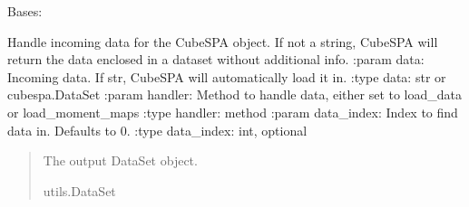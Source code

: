 \documentclass[letterpaper,10pt,english]{sphinxmanual}
\begin{document}

\begin{fulllineitems}
\label{\detokenize{modules:cubespa.data.RGBImage}}
\pysigstartsignatures
{}
\pysigstopsignatures
\sphinxAtStartPar
Bases: {\hyperref[\detokenize{modules:cubespa.data.DataSet}]{}}

\end{fulllineitems}


\begin{fulllineitems}
\label{\detokenize{modules:cubespa.data.gen_cutout}}
\pysigstartsignatures
{}
\pysigstopsignatures
\end{fulllineitems}


\begin{fulllineitems}
\label{\detokenize{modules:cubespa.data.handle_data}}
\pysigstartsignatures
{}
\pysigstopsignatures
\sphinxAtStartPar
Handle incoming data for the CubeSPA object.
If not a string, CubeSPA will return the data enclosed in a dataset without additional info.
:param data: Incoming data. If str, CubeSPA will automatically load it in.
:type data: str or cubespa.DataSet
:param handler: Method to handle data, either set to load\_data or load\_moment\_maps
:type handler: method
:param data\_index: Index to find data in. Defaults to 0.
:type data\_index: int, optional
\begin{quote}\begin{description}
\sphinxAtStartPar
The output DataSet object.

\sphinxAtStartPar
utils.DataSet

\end{description}\end{quote}

\end{fulllineitems}
\end{document}
